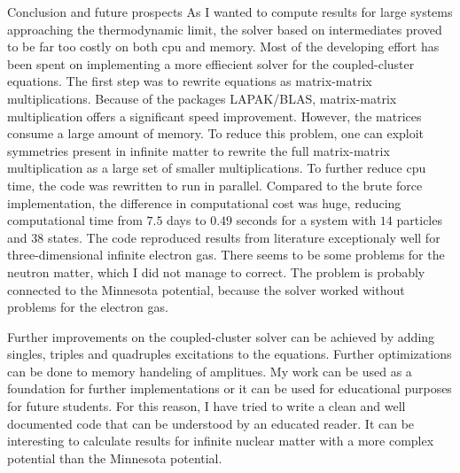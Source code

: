 \documentclass[twoside,english]{uiofysmaster}
\begin{document}
\begin{chapter}{Conclusion and future prospects}
  As I wanted to compute results for large systems approaching the thermodynamic limit, the solver based on intermediates proved to be far too costly on both cpu and memory. Most of the developing effort has been spent on implementing a more effiecient solver for the coupled-cluster equations. The first step was to rewrite equations as matrix-matrix multiplications. Because of the packages LAPAK/BLAS, matrix-matrix multiplication offers a significant speed improvement. However, the matrices consume a large amount of memory. To reduce this problem, one can exploit symmetries present in infinite matter to rewrite the full matrix-matrix multiplication as a large set of smaller multiplications. To further reduce cpu time, the code was rewritten to run in parallel. Compared to the brute force implementation, the difference in computational cost was huge, reducing computational time from $7.5$ days to $0.49$ seconds for a system with $14$ particles and $38$ states. The code reproduced results from literature exceptionaly well for three-dimensional infinite electron gas. There seems to be some problems for the neutron matter, which I did not manage to correct. The problem is probably connected to the Minnesota potential, because the solver worked without problems for the electron gas. 

  Further improvements on the coupled-cluster solver can be achieved by adding singles, triples and quadruples excitations to the equations. Further optimizations can be done to memory handeling of amplitues. My work can be used as a foundation for further implementations or it can be used for educational purposes for future students. For this reason, I have tried to write a clean and well documented code that can be understood by an educated reader. It can be interesting to calculate results for infinite nuclear matter with a more complex potential than the Minnesota potential.
\end{chapter}


\medskip
\end{document}
